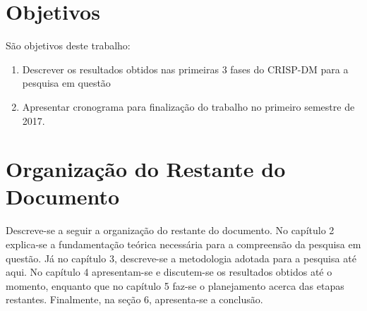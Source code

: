 \section{Objetivos}
São objetivos deste trabalho: 
\begin{enumerate}
    \item Descrever os resultados obtidos nas primeiras 3 fases do CRISP-DM para a
        pesquisa em questão
    \item Apresentar cronograma para finalização do trabalho no primeiro semestre de
        2017.
\end{enumerate}

\section{Organização do Restante do Documento}
\par Descreve-se a seguir a organização do restante do documento. 
No capítulo 2 explica-se a fundamentação teórica necessária para a compreensão da
pesquisa em questão. Já no capítulo 3, descreve-se a metodologia
adotada para a pesquisa até aqui. No capítulo 4 apresentam-se e discutem-se os resultados
obtidos até o momento, enquanto que no capítulo 5 faz-se o planejamento acerca das etapas
restantes. Finalmente, na seção 6, apresenta-se a conclusão.
